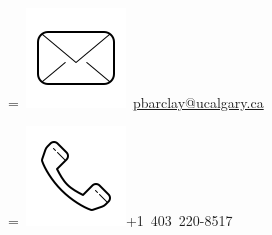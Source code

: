 \begin{adjustwidth}{2.5cm}{1.9cm}
\\
\begingroup
{}=\hbox{
\includegraphics[scale=0.1,trim={0 1cm 0cm 0cm}]{icons/main/mail.png}\hspace{0.1cm}  	\href{mailto:pbarclay@ucalgary.ca}{pbarclay@ucalgary.ca}
}
\parbox{\wd0}{}
\endgroup
\begingroup
{}=\hbox{
\includegraphics[scale=0.1,trim={0 1.25cm -0.4cm 0cm}]{icons/main/phone.png}\hspace{0.1cm}+1 403 220-8517
}
\parbox{\wd0}{}\endgroup
\\








\end{adjustwidth}
